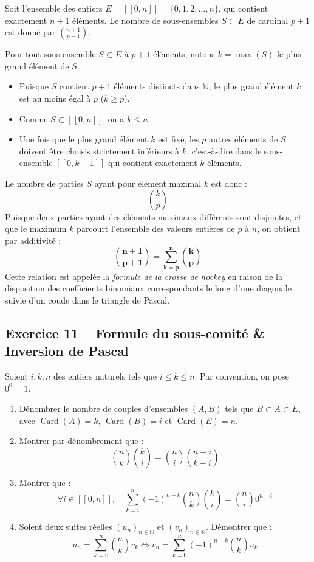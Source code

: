 \documentclass[11pt,a4paper]{article}
\newcommand{\N}{\mathbb{N}}
\begin{document}
\begin{correctionbox}
Soit l'ensemble des entiers $E = [\![0, n]\!] = \{0, 1, 2, \dots, n\}$, qui contient exactement $n + 1$ éléments.
Le nombre de sous-ensembles $S \subset E$ de cardinal $p + 1$ est donné par $\binom{n+1}{p+1}$.

Pour tout sous-ensemble $S \subset E$ à $p + 1$ éléments, notons $k = \max(S)$ le plus grand élément de $S$.
\begin{itemize}[label=$\bullet$]
    \item Puisque $S$ contient $p + 1$ éléments distincts dans $\N$, le plus grand élément $k$ est au moins égal à $p$ ($k \ge p$).
    \item Comme $S \subset [\![0, n]\!]$, on a $k \le n$.
    \item Une fois que le plus grand élément $k$ est fixé, les $p$ autres éléments de $S$ doivent être choisis strictement inférieurs à $k$, c'est-à-dire dans le sous-ensemble $[\![0, k-1]\!]$ qui contient exactement $k$ éléments.
\end{itemize}
Le nombre de parties $S$ ayant pour élément maximal $k$ est donc :
\[
\binom{k}{p}
\]
Puisque deux parties ayant des éléments maximaux différents sont disjointes, et que le maximum $k$ parcourt l'ensemble des valeurs entières de $p$ à $n$, on obtient par additivité :
\[
\mathbf{\binom{n+1}{p+1} = \sum_{k=p}^n \binom{k}{p}}
\]
Cette relation est appelée la \emph{formule de la crosse de hockey} en raison de la disposition des coefficients binomiaux correspondants le long d'une diagonale suivie d'un coude dans le triangle de Pascal.
\end{correctionbox}

\vspace{0.3cm}

\subsection*{Exercice 11 -- Formule du sous-comité \& Inversion de Pascal}

Soient $i, k, n$ des entiers naturels tels que $i \le k \le n$. Par convention, on pose $0^0 = 1$.
\begin{enumerate}[label=\arabic*.]
    \item Dénombrer le nombre de couples d'ensembles $(A, B)$ tels que $B \subset A \subset E$, avec $\operatorname{Card}(A) = k$, $\operatorname{Card}(B) = i$ et $\operatorname{Card}(E) = n$.
    \item Montrer par dénombrement que :
    \[
    \binom{n}{k} \binom{k}{i} = \binom{n}{i} \binom{n-i}{k-i}
    \]
    \item Montrer que :
    \[
    \forall i \in [\![0, n]\!], \quad \sum_{k=i}^n (-1)^{n-k} \binom{n}{k} \binom{k}{i} = \binom{n}{i} 0^{n-i}
    \]
    \item Soient deux suites réelles $(u_n)_{n \in \N}$ et $(v_n)_{n \in \N}$. Démontrer que :
    \[
    u_n = \sum_{k=0}^n \binom{n}{k} v_k \iff v_n = \sum_{k=0}^n (-1)^{n-k} \binom{n}{k} u_k
    \]
\end{enumerate}
\end{document}
